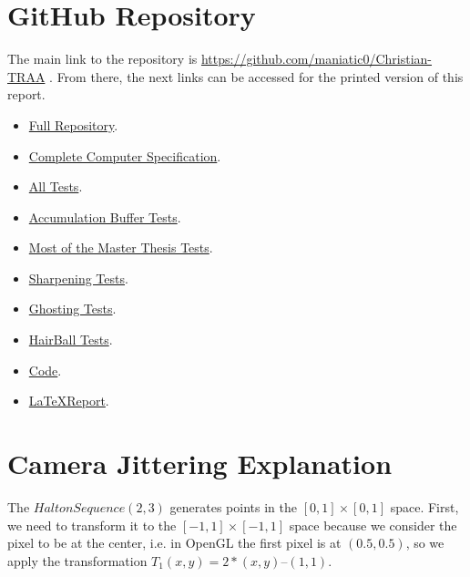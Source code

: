 \documentclass{cslthse-msc}
\begin{document}
\begin{appendices}
\chapter{GitHub Repository}
The main link to the repository is \href{https://github.com/maniatic0/Christian-TRAA}{https://github.com/maniatic0/Christian-TRAA} . From there, the next links can be accessed for the printed version of this report.
\begin{itemize}
	\item \href{https://github.com/maniatic0/Christian-TRAA}{Full Repository}.
	\item \href{https://github.com/maniatic0/Christian-TRAA/tree/master/PC\%20Specification}{Complete Computer Specification}.
	\item \href{https://github.com/maniatic0/Christian-TRAA/tree/master/Important\%20Tests}{All Tests}.
	\item \href{https://github.com/maniatic0/Christian-TRAA/tree/master/Important\%20Tests/Accumulation\%20Buffer\%20Tests}{Accumulation Buffer Tests}.
	\item \href{https://github.com/maniatic0/Christian-TRAA/tree/master/Important\%20Tests/Master\%20Thesis\%20Tests}{Most of the Master Thesis Tests}.
	\item \href{https://github.com/maniatic0/Christian-TRAA/tree/master/Important\%20Tests/Sharpening\%20Tests}{Sharpening Tests}.
	\item \href{https://github.com/maniatic0/Christian-TRAA/tree/master/Important\%20Tests/Ghosting}{Ghosting Tests}.
	\item \href{https://github.com/maniatic0/Christian-TRAA/tree/master/Important\%20Tests/HairBall}{HairBall Tests}.
	\item \href{https://github.com/maniatic0/Christian-TRAA/tree/master/CG_Labs}{Code}.
	\item \href{https://github.com/maniatic0/Christian-TRAA/tree/master/LaTeX/Master_Thesis}{\LaTeX Report}.
\end{itemize}
\chapter{Camera Jittering Explanation} \label{appendix:jitter}
The $Halton Sequence (2, 3)$ generates points in the $[0,1]\times [0,1]$ space. First, we need to transform it to the $[-1,1]\times [-1,1]$ space because we consider the pixel to be at the center, i.e. in OpenGL the first pixel is at $(0.5, 0.5)$, so we apply the transformation $T_1(x, y) = 2 * (x, y) – (1, 1)$.


\end{appendices}
\end{document}
